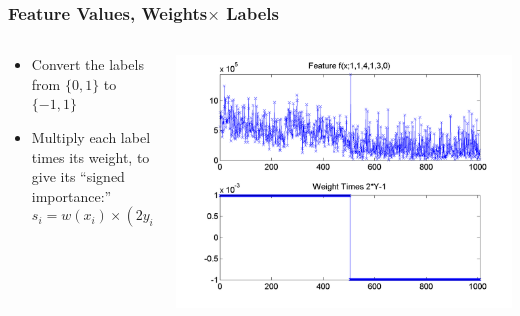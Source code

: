 \documentclass{beamer}
\begin{document}
\begin{frame}
  \frametitle{Feature Values, Weights$\times$ Labels}
  \begin{columns}
    \begin{column}{0.4\textwidth}
      \begin{itemize}
      \item Convert the labels from $\{0,1\}$ to $\{-1,1\}$
      \item Multiply each label times its weight, to give its ``signed importance:''
        \begin{displaymath}
          s_i = w(x_i)\times (2y_i-1)
        \end{displaymath}
      \end{itemize}
    \end{column}
    \begin{column}{0.6\textwidth}
      \centerline{\includegraphics[width=\textwidth]{figs/features_weightslabels.png}}
    \end{column}
  \end{columns}
\end{frame}
      
\end{document}

